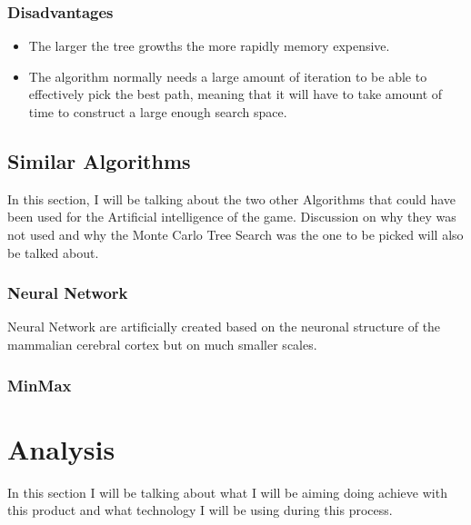 \subsubsection{Disadvantages}
\begin{itemize}
\item The larger the tree growths the more rapidly memory expensive.
\item The algorithm normally needs a large amount of iteration to be able to effectively pick the best path, meaning that it will have to take amount of time to construct a large enough search space.
\end{itemize}

\subsection{Similar Algorithms}
In this section, I will be talking about the two other Algorithms that could have been used for the Artificial intelligence of the game. Discussion on why they was not used and why the Monte Carlo Tree Search was the one to be picked will also be talked about.
\subsubsection{Neural Network}
Neural Network are artificially created based on the neuronal structure of the mammalian cerebral cortex but on much smaller scales.\cite{NeuralNetwork}
\subsubsection{MinMax}


\section{Analysis}
In this section I will be talking about what I will be aiming doing achieve with this product and what technology I will be using during this process. 
